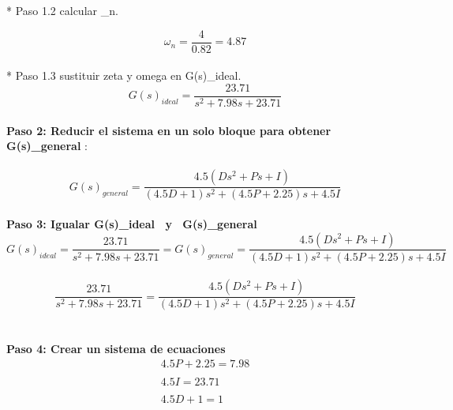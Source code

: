 \documentclass[12pt,letterpaper]{article}
\begin{document}
* Paso 1.2 calcular \omega_{n}. 

\begin{equation}\omega_{n}=\frac{4}{0.82} = 4.87\end{equation}  \\

* Paso 1.3 sustituir zeta y omega en G(s)_{ideal}. \\ 

\begin{equation}G(s)_{ideal}=\frac{23.71}{s^{2}+7.98s+23.71}\end{equation} \\ 

\textbf{Paso 2: Reducir el sistema en un solo bloque para obtener G(s)_{general} }: \\ \\ 

\begin{equation}
G(s)_{general} = \frac{4.5(Ds^{2}+Ps+I)}{(4.5D+1)s^{2}+(4.5P+2.25)s + 4.5I}\end{equation} \\ 

\textbf{Paso 3: Igualar  {G(s)_{ideal} \ y \ G(s)_{general}} } \\ 

\begin{equation}G(s)_{ideal}=\frac{23.71}{s^{2}+7.98s+23.71} = G(s)_{general} = \frac{4.5(Ds^{2}+Ps+I)}{(4.5D+1)s^{2}+(4.5P+2.25)s + 4.5I} \end{equation} \\ 

\begin{equation} \frac{23.71}{s^{2}+7.98s+23.71} =  \frac{4.5(Ds^{2}+Ps+I)}{(4.5D+1)s^{2}+(4.5P+2.25)s + 4.5I} \end{equation} \\ \\ 

\textbf{Paso 4: Crear un sistema de ecuaciones } \\ 

\begin{equation}\begin{array}{l}
4.5P+2.25=7.98 \\ \\ 
4.5I=23.71\\ \\ 
4.5D+1=1 
\end{array}\end{equation} \\ 
\end{document}
